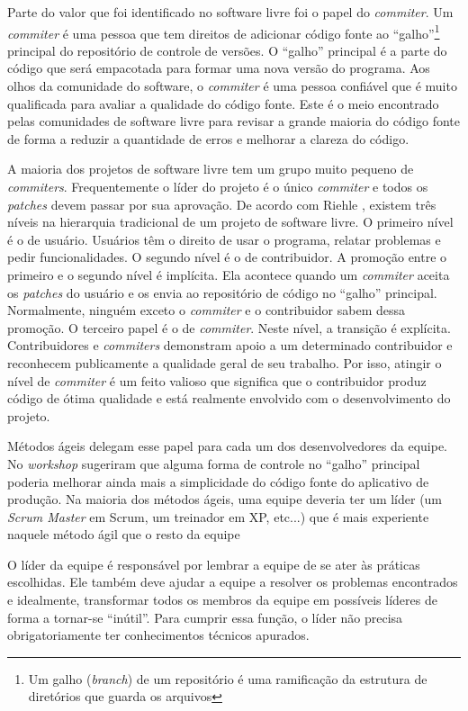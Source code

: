 
Parte do valor que foi identificado no software livre foi o papel do
\emph{commiter}. Um \emph{commiter} é uma pessoa que tem direitos de
adicionar código fonte ao ``galho''\footnote{Um galho (\emph{branch})
  de um repositório é uma ramificação da estrutura de diretórios que
  guarda os arquivos} principal do repositório de controle de
versões. O ``galho'' principal é a parte do código que será empacotada
para formar uma nova versão do programa. Aos olhos da comunidade do
software, o \emph{commiter} é uma pessoa confiável que é muito
qualificada para avaliar a qualidade do código fonte. Este é o meio
encontrado pelas comunidades de software livre para revisar a grande
maioria do código fonte de forma a reduzir a quantidade de erros e
melhorar a clareza do código.

A maioria dos projetos de software livre tem um grupo muito pequeno de
\emph{commiters}. Frequentemente o líder do projeto é o único
\emph{commiter} e todos os \emph{patches} devem passar por sua
aprovação. De acordo com Riehle \cite{Riehle2007}, existem três níveis
na hierarquia tradicional de um projeto de software livre. O primeiro
nível é o de usuário. Usuários têm o direito de usar o programa,
relatar problemas e pedir funcionalidades. O segundo nível é o de
contribuidor. A promoção entre o primeiro e o segundo nível é
implícita. Ela acontece quando um \emph{commiter} aceita os
\emph{patches} do usuário e os envia ao repositório de código no
``galho'' principal. Normalmente, ninguém exceto o \emph{commiter} e o
contribuidor sabem dessa promoção. O terceiro papel é o de
\emph{commiter}. Neste nível, a transição é explícita. Contribuidores
e \emph{commiters} demonstram apoio a um determinado contribuidor e
reconhecem publicamente a qualidade geral de seu trabalho. Por isso,
atingir o nível de \emph{commiter} é um feito valioso que significa
que o contribuidor produz código de ótima qualidade e está realmente
envolvido com o desenvolvimento do projeto.

Métodos ágeis delegam esse papel para cada um dos desenvolvedores da
equipe. No \emph{workshop} sugeriram que alguma forma de controle no
``galho'' principal poderia melhorar ainda mais a simplicidade do
código fonte do aplicativo de produção. Na maioria dos métodos ágeis,
uma equipe deveria ter um líder (um \emph{Scrum Master} em Scrum, um
treinador em XP, etc...) que é mais experiente naquele método ágil que
o resto da equipe

O líder da equipe é responsável por lembrar a equipe de se ater às
práticas escolhidas. Ele também deve ajudar a equipe a resolver os
problemas encontrados e idealmente, transformar todos os membros da
equipe em possíveis líderes de forma a tornar-se ``inútil''. Para
cumprir essa função, o líder não precisa obrigatoriamente ter
conhecimentos técnicos apurados.

